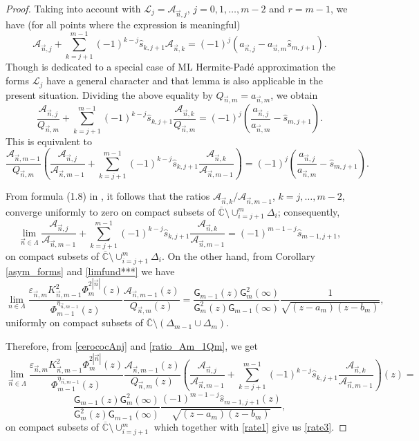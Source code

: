 \documentclass{amsart}
\numberwithin{equation}{section}
\theoremstyle{definition}
\newcommand{\CC}{\mathbb{C}}      %
\newcommand{\n}{\vec{n}}          %
\begin{document}
\begin{proof} Taking into account \cite[Lemma 2.1]{LSJ19} with $\mathcal{L}_j=\mathcal{A}_{\n,j}$, $j=0,1,\ldots,m-2$ and $r=m-1$, we have (for all points where the expression is meaningful)
\[
\mathcal{A}_{\n,j} + \sum_{k=j+1}^{m-1} (-1)^{k-j} \widehat{s}_{k,j+1}\mathcal{A}_{\n,k} = (-1)^j(a_{\n,j}-a_{\n,m}\widehat{s}_{m,j+1}).
\]
Though \cite{LSJ19} is dedicated to a special case of ML Hermite-Pad\'e approximation the forms $\mathcal{L}_j$ have a general character and that lemma is also applicable in the present situation.
Dividing the above equality by $Q_{\n,m} = a_{\n,m}$, we obtain
\[
\frac{\mathcal{A}_{\n,j}}{Q_{\n,m}} + \sum_{k=j+1}^{m-1} (-1)^{k-j} \widehat{s}_{k,j+1}\frac{\mathcal{A}_{\n,k}}{Q_{\n,m}} = (-1)^j\left(\frac{a_{\n,j}}{a_{\n,m}}- \widehat{s}_{m,j+1}\right).
\]
This is equivalent to
\begin{equation}
	\label{rate1}
\frac{\mathcal{A}_{\n,m-1}}{Q_{\n,m}} \left(\frac{\mathcal{A}_{\n,j}}{\mathcal{A}_{\n,m-1}} + \sum_{k=j+1}^{m-1} (-1)^{k-j} \widehat{s}_{k,j+1}\frac{\mathcal{A}_{\n,k}}{\mathcal{A}_{\n,m-1}} \right) = (-1)^j\left(\frac{a_{\n,j}}{a_{\n,m}}- \widehat{s}_{m,j+1}\right).
\end{equation}

From formula (1.8) in \cite[Proposition 1.2]{lysov20}, it follows that the ratios $\mathcal{A}_{\n,k}/\mathcal{A}_{\n,m-1}$, $k=j,\ldots,m-2$, converge uniformly to zero on compact subsets of $\overline{\CC}\setminus \cup_{i=j+1}^m \Delta_{i}$;  consequently,
\begin{equation}
	\label{cerococAnj}
\lim_{\n \in \Lambda}  \frac{\mathcal{A}_{\n,j}}{\mathcal{A}_{\n,m-1}} + \sum_{k=j+1}^{m-1} (-1)^{k-j} \widehat{s}_{k,j+1}\frac{\mathcal{A}_{\n,k}}{\mathcal{A}_{\n,m-1}} = (-1)^{m-1-j} \widehat{s}_{m-1,j+1},
\end{equation}
on compact subsets of $\overline{\CC}\setminus \cup_{i=j+1}^m \Delta_{i}$. On the other hand, from Corollary \ref{asym_forms} and \eqref{limfund***} we have
\begin{equation}
	\label{ratio_Am_1Qm}
	\lim_{n\in\Lambda} \frac{\varepsilon_{\n,m}K_{\n,m-1}^2\Phi_m^{2|\n|}(z)}{\Phi_{m-1}^{\eta_{\n,m-1}}(z)} \frac{\mathcal{A}_{\n,m-1}(z)}{Q_{\n,m}(z)} = \frac{\mathsf{G}_{m-1}(z)\mathsf{G}_m^{2}(\infty)}{\mathsf{G}_m^{2}(z)\mathsf{G}_{m-1}(\infty)}\frac{1}{\sqrt{(z-a_m)(z-b_m)}},
\end{equation}
uniformly on compact subsets of $\overline{\CC}\setminus(\Delta_{m-1}\cup\Delta_m)$.


Therefore, from \eqref{cerococAnj} and \eqref{ratio_Am_1Qm}, we get
\[
	\lim_{\n\in\Lambda} \frac{\varepsilon_{\n,m}K_{\n,m-1}^2\Phi_m^{2|\n|}(z)}{\Phi_{m-1}^{\eta_{\n,m-1}}(z)} \frac{\mathcal{A}_{\n,m-1}(z)}{Q_{\n,m}(z)} \left(\frac{\mathcal{A}_{\n,j}}{\mathcal{A}_{\n,m-1}} + \sum_{k=j+1}^{m-1} (-1)^{k-j} \widehat{s}_{k,j+1}\frac{\mathcal{A}_{\n,k}}{\mathcal{A}_{\n,m-1}} \right)(z) =\]
\[ \frac{\mathsf{G}_{m-1}(z)\mathsf{G}_m^{2}(\infty)}{\mathsf{G}_m^{2}(z)\mathsf{G}_{m-1}(\infty)}\frac{(-1)^{m-1-j} \widehat{s}_{m-1,j+1}(z)}{\sqrt{(z-a_m)(z-b_m)}},
\]
on compact subsets of $\overline{\CC}\setminus \cup_{i=j+1}^m$ which together with \eqref{rate1} give us \eqref{rate3}.
\end{proof}
\end{document}
